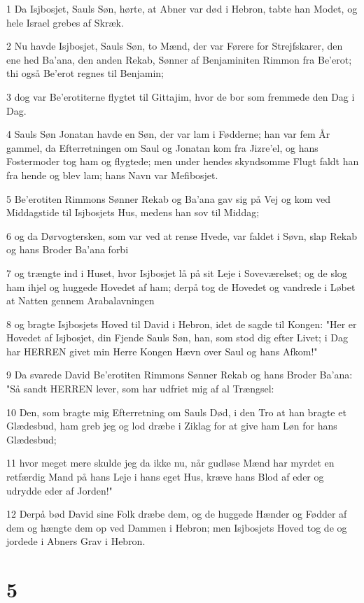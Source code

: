 \par 1 Da Isjbosjet, Sauls Søn, hørte, at Abner var død i Hebron, tabte han Modet, og hele Israel grebes af Skræk.
\par 2 Nu havde Isjbosjet, Sauls Søn, to Mænd, der var Førere for Strejfskarer, den ene hed Ba'ana, den anden Rekab, Sønner af Benjaminiten Rimmon fra Be'erot; thi også Be'erot regnes til Benjamin;
\par 3 dog var Be'erotiterne flygtet til Gittajim, hvor de bor som fremmede den Dag i Dag.
\par 4 Sauls Søn Jonatan havde en Søn, der var lam i Fødderne; han var fem År gammel, da Efterretningen om Saul og Jonatan kom fra Jizre'el, og hans Fostermoder tog ham og flygtede; men under hendes skyndsomme Flugt faldt han fra hende og blev lam; hans Navn var Mefibosjet.
\par 5 Be'erotiten Rimmons Sønner Rekab og Ba'ana gav sig på Vej og kom ved Middagstide til Isjbosjets Hus, medens han sov til Middag;
\par 6 og da Dørvogtersken, som var ved at rense Hvede, var faldet i Søvn, slap Rekab og hans Broder Ba'ana forbi
\par 7 og trængte ind i Huset, hvor Isjbosjet lå på sit Leje i Soveværelset; og de slog ham ihjel og huggede Hovedet af ham; derpå tog de Hovedet og vandrede i Løbet at Natten gennem Arabalavningen
\par 8 og bragte Isjbosjets Hoved til David i Hebron, idet de sagde til Kongen: "Her er Hovedet af Isjbosjet, din Fjende Sauls Søn, han, som stod dig efter Livet; i Dag har HERREN givet min Herre Kongen Hævn over Saul og hans Afkom!"
\par 9 Da svarede David Be'erotiten Rimmons Sønner Rekab og hans Broder Ba'ana: "Så sandt HERREN lever, som har udfriet mig af al Trængsel:
\par 10 Den, som bragte mig Efterretning om Sauls Død, i den Tro at han bragte et Glædesbud, ham greb jeg og lod dræbe i Ziklag for at give ham Løn for hans Glædesbud;
\par 11 hvor meget mere skulde jeg da ikke nu, når gudløse Mænd har myrdet en retfærdig Mand på hans Leje i hans eget Hus, kræve hans Blod af eder og udrydde eder af Jorden!"
\par 12 Derpå bød David sine Folk dræbe dem, og de huggede Hænder og Fødder af dem og hængte dem op ved Dammen i Hebron; men Isjbosjets Hoved tog de og jordede i Abners Grav i Hebron.

\chapter{5}

